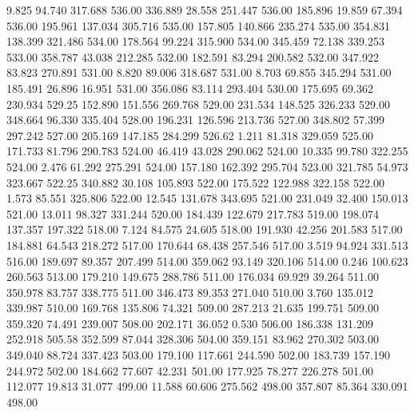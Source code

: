    9.825   94.740  317.688       536.00
 336.889   28.558  251.447       536.00
 185.896   19.859   67.394       536.00
 195.961  137.034  305.716       535.00
 157.805  140.866  235.274       535.00
 354.831  138.399  321.486       534.00
 178.564   99.224  315.900       534.00
 345.459   72.138  339.253       533.00
 358.787   43.038  212.285       532.00
 182.591   83.294  200.582       532.00
 347.922   83.823  270.891       531.00
   8.820   89.006  318.687       531.00
   8.703   69.855  345.294       531.00
 185.491   26.896   16.951       531.00
 356.086   83.114  293.404       530.00
 175.695   69.362  230.934       529.25
 152.890  151.556  269.768       529.00
 231.534  148.525  326.233       529.00
 348.664   96.330  335.404       528.00
 196.231  126.596  213.736       527.00
 348.802   57.399  297.242       527.00
 205.169  147.185  284.299       526.62
   1.211   81.318  329.059       525.00
 171.733   81.796  290.783       524.00
  46.419   43.028  290.062       524.00
  10.335   99.780  322.255       524.00
   2.476   61.292  275.291       524.00
 157.180  162.392  295.704       523.00
 321.785   54.973  323.667       522.25
 340.882   30.108  105.893       522.00
 175.522  122.988  322.158       522.00
   1.573   85.551  325.806       522.00
  12.545  131.678  343.695       521.00
 231.049   32.400  150.013       521.00
  13.011   98.327  331.244       520.00
 184.439  122.679  217.783       519.00
 198.074  137.357  197.322       518.00
   7.124   84.575   24.605       518.00
 191.930   42.256  201.583       517.00
 184.881   64.543  218.272       517.00
 170.644   68.438  257.546       517.00
   3.519   94.924  331.513       516.00
 189.697   89.357  207.499       514.00
 359.062   93.149  320.106       514.00
   0.246  100.623  260.563       513.00
 179.210  149.675  288.786       511.00
 176.034   69.929   39.264       511.00
 350.978   83.757  338.775       511.00
 346.473   89.353  271.040       510.00
   3.760  135.012  339.987       510.00
 169.768  135.806   74.321       509.00
 287.213   21.635  199.751       509.00
 359.320   74.491  239.007       508.00
 202.171   36.052    0.530       506.00
 186.338  131.209  252.918       505.58
 352.599   87.044  328.306       504.00
 359.151   83.962  270.302       503.00
 349.040   88.724  337.423       503.00
 179.100  117.661  244.590       502.00
 183.739  157.190  244.972       502.00
 184.662   77.607   42.231       501.00
 177.925   78.277  226.278       501.00
 112.077   19.813   31.077       499.00
  11.588   60.606  275.562       498.00
 357.807   85.364  330.091       498.00
